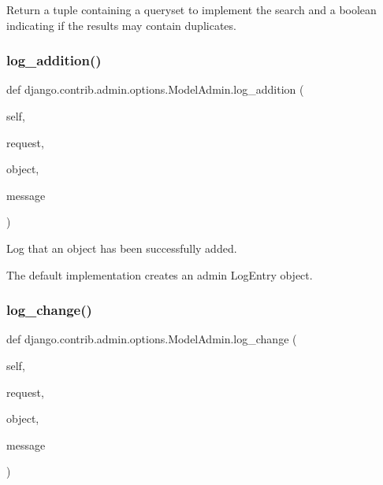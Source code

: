 \begin{DoxyVerb}Return a tuple containing a queryset to implement the search
and a boolean indicating if the results may contain duplicates.
\end{DoxyVerb}
 \mbox{\label{classdjango_1_1contrib_1_1admin_1_1options_1_1_model_admin_abad1d1520beec051e1ac0763112d55d8}} 
\subsubsection{\texorpdfstring{log\+\_\+addition()}{log\_addition()}}
{\footnotesize\ttfamily def django.\+contrib.\+admin.\+options.\+Model\+Admin.\+log\+\_\+addition (\begin{DoxyParamCaption}\item[{}]{self,  }\item[{}]{request,  }\item[{}]{object,  }\item[{}]{message }\end{DoxyParamCaption})}

\begin{DoxyVerb}Log that an object has been successfully added.

The default implementation creates an admin LogEntry object.
\end{DoxyVerb}
 \mbox{\label{classdjango_1_1contrib_1_1admin_1_1options_1_1_model_admin_ae75e8f5048939e928e649d9d1f35c9c0}} 
\subsubsection{\texorpdfstring{log\+\_\+change()}{log\_change()}}
{\footnotesize\ttfamily def django.\+contrib.\+admin.\+options.\+Model\+Admin.\+log\+\_\+change (\begin{DoxyParamCaption}\item[{}]{self,  }\item[{}]{request,  }\item[{}]{object,  }\item[{}]{message }\end{DoxyParamCaption})}

